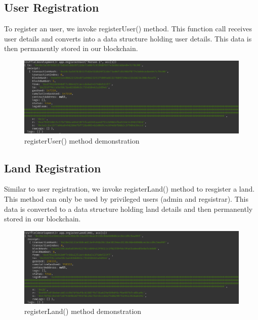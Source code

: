 \documentclass[11pt]{article}
\begin{document}
\subsection{User Registration}
\label{sec:org92f1944}
To register an user, we invoke registerUser() method. This function call receives user details and converts into a data structure holding user details. This data is then permanently stored in our blockchain.

\begin{figure}[htbp]
\centering
\includegraphics[width=.9\linewidth]{./register-person-1.png}
\caption{registerUser() method demonstration}
\end{figure}

\subsection{Land Registration}
\label{sec:org399147b}
Similar to user registration, we invoke registerLand() method to resgister a land. This method can only be used by privileged users (admin and regsistrar).
This data is converted to a data structure holding land details and then permanently stored in our blockchain. 

\begin{figure}[htbp]
\centering
\includegraphics[width=.9\linewidth]{./register-land-1.png}
\caption{registerLand() method demonstration}
\end{figure}
\end{document}
